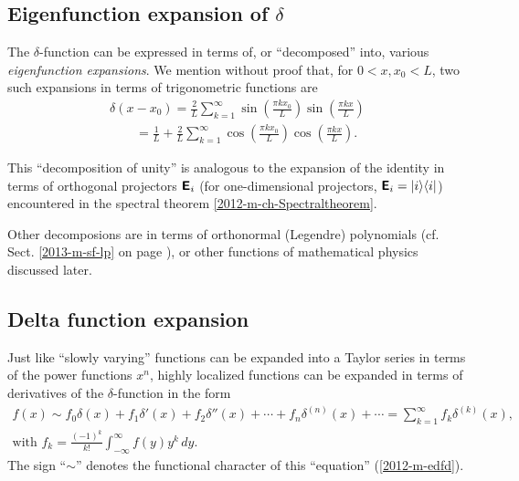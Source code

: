\subsection{Eigenfunction expansion of $\delta$}
\label{2012-m-efed1}

The  $\delta$-function can be expressed  in terms of, or ``decomposed'' into, various
{\em eigenfunction expansions}.
We mention without proof
\cite{duffy2001} that, for $0< x,x_0 <L$,
two such expansions in terms of trigonometric functions are
\begin{equation}
\begin{split}
\delta (x-x_0) =
\frac{2}{L}
\sum_{k=1}^\infty
\sin \left( \frac{\pi k x_0}{L}\right)
\sin \left( \frac{\pi k x}{L}\right)\\
\qquad  =
\frac{1}{L}
+
\frac{2}{L}
\sum_{k=1}^\infty
\cos \left( \frac{\pi k x_0}{L}\right)
\cos \left( \frac{\pi k x}{L}\right).
\end{split}
\label{2012-m-efed}
\end{equation}

This ``decomposition of unity'' is analogous to the expansion of the identity in terms of orthogonal projectors
$\textsf{\textbf{E}}_i$  (for one-dimensional projectors, $\textsf{\textbf{E}}_i=\vert i\rangle \langle i \vert $)
encountered in the spectral theorem \ref{2012-m-ch-Spectraltheorem}.

Other decomposions are in terms of orthonormal (Legendre) polynomials (cf. Sect. \ref{2013-m-sf-lp} on page \pageref{2013-m-sf-lp}),
or other functions of mathematical physics discussed later.

\subsection{Delta function expansion}
\label{2012-m-dfex}

Just like ``slowly varying'' functions can be expanded into a Taylor series in terms of the power functions $x^n$,
highly localized functions can be expanded in terms of derivatives of the $\delta$-function in the form \cite{lindell:438}
\begin{equation}
\begin{split}
f(x) \sim
f_0 \delta (x) +
f_1 \delta' (x) +
f_2 \delta'' (x) + \cdots +f_n \delta^{(n)}(x) + \cdots =\sum_{k=1}^\infty f_k \delta^{(k)}(x),\\
\textrm{with } f_k= \frac{(-1)^k}{k!} \int_{-\infty}^\infty f(y) y^k \, dy
.
\end{split}
\label{2012-m-edfd}
\end{equation}
The sign ``$\sim$'' denotes the functional character of this ``equation'' (\ref{2012-m-edfd}).

